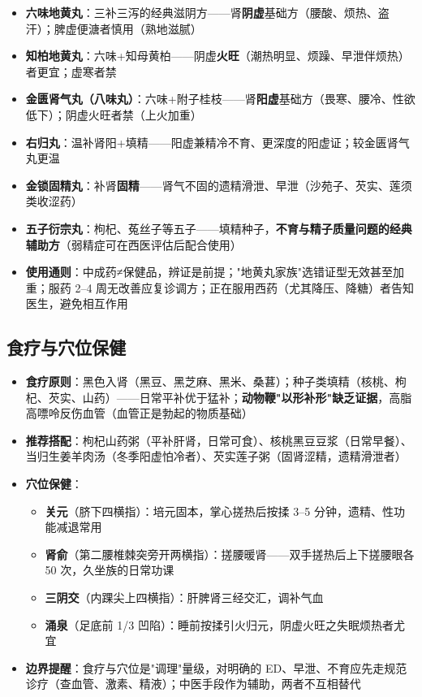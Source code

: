 \begin{itemize}
	\item \textbf{六味地黄丸}：三补三泻的经典滋阴方——肾\textbf{阴虚}基础方（腰酸、烦热、盗汗）；脾虚便溏者慎用（熟地滋腻）
	\item \textbf{知柏地黄丸}：六味+知母黄柏——阴虚\textbf{火旺}（潮热明显、烦躁、早泄伴烦热）者更宜；虚寒者禁
	\item \textbf{金匮肾气丸（八味丸）}：六味+附子桂枝——肾\textbf{阳虚}基础方（畏寒、腰冷、性欲低下）；阴虚火旺者禁（上火加重）
	\item \textbf{右归丸}：温补肾阳+填精——阳虚兼精冷不育、更深度的阳虚证；较金匮肾气丸更温
	\item \textbf{金锁固精丸}：补肾\textbf{固精}——肾气不固的遗精滑泄、早泄（沙苑子、芡实、莲须类收涩药）
	\item \textbf{五子衍宗丸}：枸杞、菟丝子等五子——填精种子，\textbf{不育与精子质量问题的经典辅助方}（弱精症可在西医评估后配合使用）
	\item \textbf{使用通则}：中成药≠保健品，辨证是前提；"地黄丸家族"选错证型无效甚至加重；服药 2--4 周无改善应复诊调方；正在服用西药（尤其降压、降糖）者告知医生，避免相互作用
\end{itemize}

\subsection{食疗与穴位保健}


\begin{itemize}
	\item \textbf{食疗原则}：黑色入肾（黑豆、黑芝麻、黑米、桑葚）；种子类填精（核桃、枸杞、芡实、山药）——日常平补优于猛补；\textbf{动物鞭"以形补形"缺乏证据}，高脂高嘌呤反伤血管（血管正是勃起的物质基础）
	\item \textbf{推荐搭配}：枸杞山药粥（平补肝肾，日常可食）、核桃黑豆豆浆（日常早餐）、当归生姜羊肉汤（冬季阳虚怕冷者）、芡实莲子粥（固肾涩精，遗精滑泄者）
	\item \textbf{穴位保健}：
	\begin{itemize}
		\item \textbf{关元}（脐下四横指）：培元固本，掌心搓热后按揉 3--5 分钟，遗精、性功能减退常用
		\item \textbf{肾俞}（第二腰椎棘突旁开两横指）：搓腰暖肾——双手搓热后上下搓腰眼各 50 次，久坐族的日常功课
		\item \textbf{三阴交}（内踝尖上四横指）：肝脾肾三经交汇，调补气血
		\item \textbf{涌泉}（足底前 1/3 凹陷）：睡前按揉引火归元，阴虚火旺之失眠烦热者尤宜
	\end{itemize}
	\item \textbf{边界提醒}：食疗与穴位是"调理"量级，对明确的 ED、早泄、不育应先走规范诊疗（查血管、激素、精液）；中医手段作为辅助，两者不互相替代
\end{itemize}



